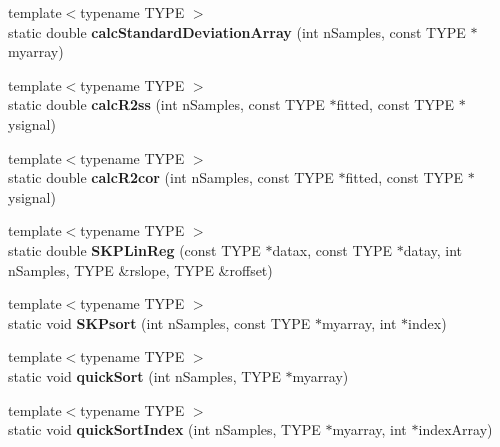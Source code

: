 \begin{DoxyCompactItemize}
\item 
\hypertarget{class_k_w_util_ad9d38c641f6b227be4418acf404170d4}{{\footnotesize template$<$typename T\-Y\-P\-E $>$ }\\static double {\bfseries calc\-Standard\-Deviation\-Array} (int n\-Samples, const T\-Y\-P\-E $\ast$myarray)}\label{class_k_w_util_ad9d38c641f6b227be4418acf404170d4}

\item 
\hypertarget{class_k_w_util_ae26dd38b1c5c823fa37129520bb4cc47}{{\footnotesize template$<$typename T\-Y\-P\-E $>$ }\\static double {\bfseries calc\-R2ss} (int n\-Samples, const T\-Y\-P\-E $\ast$fitted, const T\-Y\-P\-E $\ast$ysignal)}\label{class_k_w_util_ae26dd38b1c5c823fa37129520bb4cc47}

\item 
\hypertarget{class_k_w_util_a9eecfdafa3ae5e493830181fa7ea8fa3}{{\footnotesize template$<$typename T\-Y\-P\-E $>$ }\\static double {\bfseries calc\-R2cor} (int n\-Samples, const T\-Y\-P\-E $\ast$fitted, const T\-Y\-P\-E $\ast$ysignal)}\label{class_k_w_util_a9eecfdafa3ae5e493830181fa7ea8fa3}

\item 
\hypertarget{class_k_w_util_ac7633e5346a8b4ad6b2d1d960eb22fc9}{{\footnotesize template$<$typename T\-Y\-P\-E $>$ }\\static double {\bfseries S\-K\-P\-Lin\-Reg} (const T\-Y\-P\-E $\ast$datax, const T\-Y\-P\-E $\ast$datay, int n\-Samples, T\-Y\-P\-E \&rslope, T\-Y\-P\-E \&roffset)}\label{class_k_w_util_ac7633e5346a8b4ad6b2d1d960eb22fc9}

\item 
\hypertarget{class_k_w_util_adea3028ddaac44e13ab60460b0e50452}{{\footnotesize template$<$typename T\-Y\-P\-E $>$ }\\static void {\bfseries S\-K\-Psort} (int n\-Samples, const T\-Y\-P\-E $\ast$myarray, int $\ast$index)}\label{class_k_w_util_adea3028ddaac44e13ab60460b0e50452}

\item 
\hypertarget{class_k_w_util_aacc2b444dd10145dea4367714527efa9}{{\footnotesize template$<$typename T\-Y\-P\-E $>$ }\\static void {\bfseries quick\-Sort} (int n\-Samples, T\-Y\-P\-E $\ast$myarray)}\label{class_k_w_util_aacc2b444dd10145dea4367714527efa9}

\item 
\hypertarget{class_k_w_util_aba1906d9b0de1262e0ce837b15e8401f}{{\footnotesize template$<$typename T\-Y\-P\-E $>$ }\\static void {\bfseries quick\-Sort\-Index} (int n\-Samples, T\-Y\-P\-E $\ast$myarray, int $\ast$index\-Array)}\label{class_k_w_util_aba1906d9b0de1262e0ce837b15e8401f}


\end{DoxyCompactItemize}

